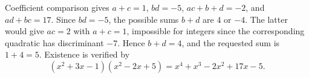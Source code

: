 Coefficient comparison gives $a+c=1$, $bd=-5$, $ac+b+d=-2$, and $ad+bc=17$. Since $bd=-5$, the possible sums $b+d$ are $4$ or $-4$. The latter would give $ac=2$ with $a+c=1$, impossible for integers since the corresponding quadratic has discriminant $-7$. Hence $b+d=4$, and the requested sum is $\boxed{1+4=5}$.
Existence is verified by
\[(x^2+3x-1)(x^2-2x+5)=x^4+x^3-2x^2+17x-5.\]
